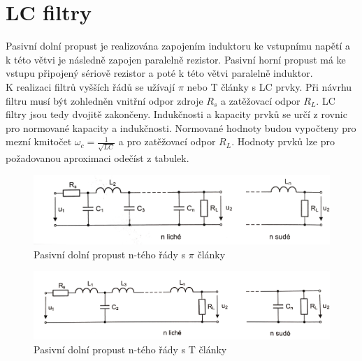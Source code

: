 \documentclass[twoside]{article}
\begin{document}
\section{LC filtry}
Pasivní dolní propust je realizována zapojením induktoru ke vstupnímu napětí a k této větvi je následně zapojen paralelně rezistor. Pasivní horní propust má ke vstupu připojený sériově rezistor a poté k této větvi paralelně induktor. \\
K realizaci filtrů vyšších řádů se užívají $\pi$ nebo T články s LC prvky. Při návrhu filtru musí být zohledněn vnitřní odpor zdroje $R_s$ a zatěžovací odpor $R_L$. LC filtry jsou tedy dvojitě zakončeny. Indukčnosti a kapacity prvků se určí z rovnic pro normované kapacity a indukčnosti. Normované hodnoty budou vypočteny pro mezní kmitočet $\omega _c = \frac{1}{\sqrt{LC}}$ a pro zatěžovací odpor $R_L$. Hodnoty prvků lze pro požadovanou aproximaci odečíst z tabulek. \\
\begin{figure}[H]
\centering
\includegraphics[scale=0.1]{piclanky.png}
\caption{Pasivní dolní propust n-tého řády s $\pi$ články \cite{10}}
\end{figure}
\begin{figure}[H]
\centering
\includegraphics[scale=0.08]{tclanky.png}
\caption{Pasivní dolní propust n-tého řády s T články \cite{10}}
\end{figure}
\end{document}
